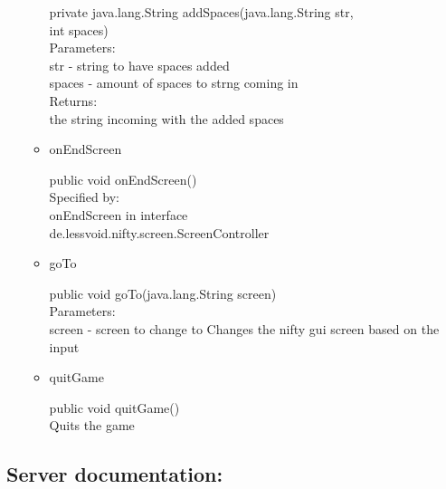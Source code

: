 \documentclass[letterpaper]{article}
\begin{document}
\begin{itemize}
\begin{itemize}
		    private java.lang.String addSpaces(java.lang.String str,\\
		                             int spaces) \\
		
		    Parameters: \\
		        str - string to have spaces added \\
		        spaces - amount of spaces to strng coming in \\
		    Returns: \\
		        the string incoming with the added spaces \\
		        
		    \item onEndScreen
		
		    public void onEndScreen() \\
		
		    Specified by: \\
		        onEndScreen in interface \\ de.lessvoid.nifty.screen.ScreenController
		
		    \item goTo
		
		    public void goTo(java.lang.String screen) \\
		
		    Parameters: \\
		        screen - screen to change to Changes the nifty gui screen based on the input \\
		
		    \item quitGame
		
		    public void quitGame() \\
		
		    Quits the game \\
		
		
		
		
												\end{itemize}
									\end{itemize}
							
							\vspace{0.2in}
							\subsection*{Server documentation:}
							\vspace{0.1in}
							
\end{document}
